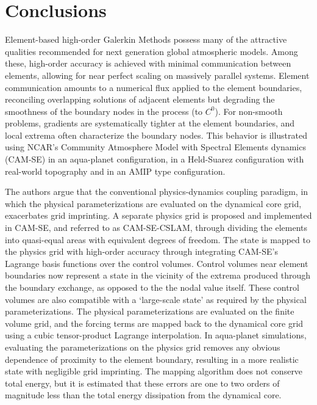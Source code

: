 \documentclass[twocol]{ametsoc}
\begin{document}
\section{Conclusions}\label{sec:conclusions}

Element-based high-order Galerkin Methods possess many of the attractive qualities recommended for next generation global atmospheric models. Among these, high-order accuracy is achieved with minimal communication between elements, allowing for near perfect scaling on massively parallel systems. Element communication amounts to a numerical flux applied to the element boundaries, reconciling overlapping solutions of adjacent elements but degrading the smoothness of the boundary nodes in the process (to $C^0$). For non-smooth problems, gradients are systematically tighter at the element boundaries, and local extrema often characterize the boundary nodes. This behavior is illustrated using NCAR's Community Atmosphere Model with Spectral Elements dynamics (CAM-SE) in an aqua-planet configuration, in a Held-Suarez configuration with real-world topography {\color{red}and in an AMIP type configuration.}

The authors argue that the conventional physics-dynamics coupling paradigm, in which the physical parameterizations are evaluated on the dynamical core grid, exacerbates grid imprinting. A separate physics grid is proposed and implemented in CAM-SE, and referred to as CAM-SE-CSLAM, through dividing the elements into quasi-equal areas with equivalent degrees of freedom. The state is mapped to the physics grid with high-order accuracy through integrating CAM-SE's Lagrange basis functions over the control volumes. Control volumes near element boundaries now represent a state in the vicinity of the extrema produced through the boundary exchange, as opposed to the the nodal value itself. These control volumes are also compatible with a `large-scale state' as required by the physical parameterizations. The physical parameterizations are evaluated on the finite volume grid, and the forcing terms are mapped back to the dynamical core grid using a cubic tensor-product Lagrange interpolation. In aqua-planet simulations, evaluating the parameterizations on the physics grid removes any obvious dependence of proximity to the element boundary, resulting in a more realistic state with negligible grid imprinting. The mapping algorithm does not conserve total energy, but it is estimated that these errors are one to two orders of magnitude less than the total energy dissipation from the dynamical core.
\end{document}
